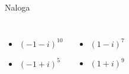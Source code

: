 \begin{frame}
{\begin{exampleblock}{Naloga}
\begin{columns}
                    \begin{itemize}
                        \item $\left(-1-i\right)^{10}$ 
                        \item $\left(-1+i\right)^5$ 
                    \end{itemize}


                    \begin{itemize}
                        \item $\left(1-i\right)^7$ 
                        \item $\left(1+i\right)^9$ 
                    \end{itemize}

                \end{columns}

            \end{exampleblock}}
        \end{frame}
        



